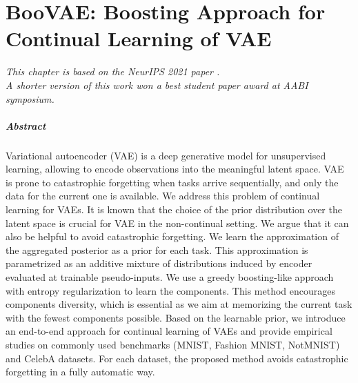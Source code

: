\chapter{BooVAE: Boosting Approach for Continual Learning of VAE}\label{chap:boovae}


\begin{flushright}
	\small{
		\textit{
			\hfill This chapter is based on the NeurIPS 2021 paper \citep{egorov2021boovae}.\\ 
			\hfill A shorter version of this work won a best student paper award at AABI symposium.
		} 
		
	}
\end{flushright}

\paragraph{Abstract}
Variational autoencoder (VAE) is a deep generative model for unsupervised learning, allowing to encode observations into the meaningful latent space. VAE is prone to catastrophic forgetting when tasks arrive sequentially, and only the data for the current one is available. We address this problem of continual learning for VAEs. It is known that the choice of the prior distribution over the latent space is crucial for VAE in the non-continual setting. We argue that it can also be helpful to avoid catastrophic forgetting. We learn the approximation of the aggregated posterior as a prior for each task. This approximation is parametrized as an additive mixture of distributions induced by encoder evaluated at trainable pseudo-inputs. We use a greedy boosting-like approach with entropy regularization to learn the components. This method encourages components diversity, which is essential as we aim at memorizing the current task with the fewest components possible. Based on the learnable prior, we introduce an end-to-end approach for continual learning of VAEs and provide empirical studies on commonly used benchmarks (MNIST, Fashion MNIST, NotMNIST) and CelebA datasets. For each dataset, the proposed method avoids catastrophic forgetting in a fully automatic way.

